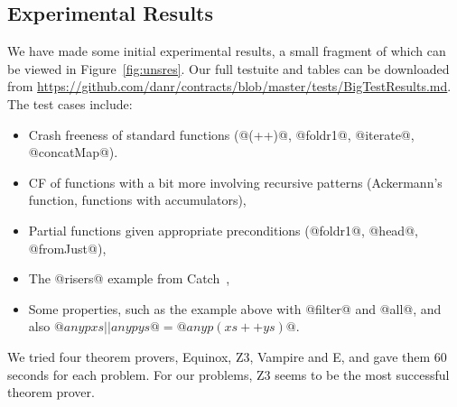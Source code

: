 \subsection{Experimental Results}



We have made some initial experimental results, a small fragment of which can be 
viewed in Figure~\ref{fig:unsres}. Our full testuite and tables can be downloaded from
\url{https://github.com/danr/contracts/blob/master/tests/BigTestResults.md}.
The test cases include:
\begin{itemize}
  \item Crash freeness of standard functions
    (@(++)@, @foldr1@, @iterate@, @concatMap@).

  \item CF of functions with a bit more involving recursive patterns
        (Ackermann's function, functions with accumulators),

%

  \item Partial functions given appropriate preconditions
        (@foldr1@, @head@, @fromJust@),

  \item The @risers@ example from Catch~\citep{Mitchell:2008:PBE:1411286.1411293},

  \item Some properties, such as the example above with @filter@ and @all@,
        and also $@any p xs || any p ys@ = @any p (xs ++ ys)@$.
\end{itemize}

We tried four theorem provers, Equinox, Z3, Vampire and E, and gave
them 60 seconds for each problem. For our problems, Z3 seems to be the most
successful theorem prover.

